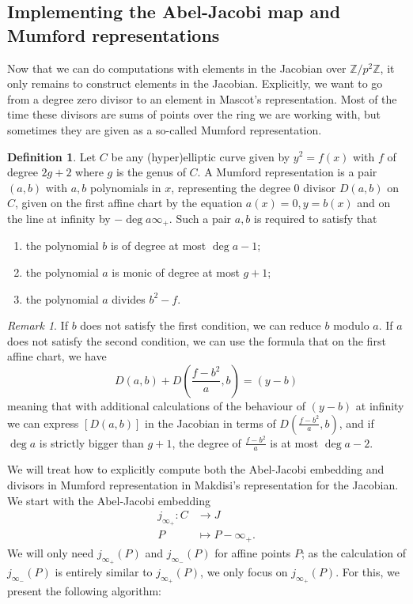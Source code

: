 \documentclass[12pt]{article}
\newcommand{\Z}{\mathbb{Z}}
\theoremstyle{plain}
\theoremstyle{definition}
\newtheorem{defn}[thm]{Definition} %
\theoremstyle{remark}
\newtheorem{rem}[thm]{Remark} %
\begin{document}
\subsection{Implementing the Abel-Jacobi map and Mumford representations}
Now that we can do computations with elements in the Jacobian over $\Z/p^2\Z$, it only remains to construct elements in the Jacobian. Explicitly, we want to go from a degree zero divisor to an element in Mascot's representation. Most of the time these divisors are sums of points over the ring we are working with, but sometimes they are given as a so-called Mumford representation.
\begin{defn}
Let $C$ be any (hyper)elliptic curve given by $y^2 = f(x)$ with $f$ of degree $2g+2$ where $g$ is the genus of $C$. A Mumford representation is a pair $(a,b)$ with $a,b$ polynomials in $x$, representing the degree $0$ divisor $D(a,b)$ on $C$, given on the first affine chart by the equation $a(x) = 0, y = b(x)$ and on the line at infinity by $-\deg a\infty_+$. Such a pair $a,b$ is required to satisfy that
\begin{enumerate}
\item the polynomial $b$ is of degree at most $\deg a -1$;
\item the polynomial $a$ is monic of degree at most $g+1$;
\item the polynomial $a$ divides $b^2 - f$.
\end{enumerate}
\end{defn}
\begin{rem}
If $b$ does not satisfy the first condition, we can reduce $b$ modulo $a$. If $a$ does not satisfy the second condition, we can use the formula that on the first affine chart, we have
\[
D(a,b) + D\left(\frac{f-b^2}{a},b\right) = (y-b)
\]
meaning that with additional calculations of the behaviour of $(y-b)$ at infinity we can express $[D(a,b)]$ in the Jacobian in terms of $D(\frac{f-b^2}{a},b)$, and if $\deg a$ is strictly bigger than $g+1$, the degree of $\frac{f-b^2}{a}$ is at most $\deg a -2$.
\end{rem}

We will treat how to explicitly compute both the Abel-Jacobi embedding and divisors in Mumford representation in Makdisi's representation for the Jacobian. We start with the Abel-Jacobi embedding 
\begin{align*}
j_{\infty_+}: C &\to J \\
              P &\mapsto P-\infty_+.
\end{align*}
We will only need $j_{\infty_+}(P)$ and $j_{\infty_-}(P)$ for affine points $P$; as the calculation of $j_{\infty_-}(P)$ is entirely similar to $j_{\infty_+}(P)$, we only focus on $j_{\infty_+}(P)$. For this, we present the following algorithm:
\end{document}
